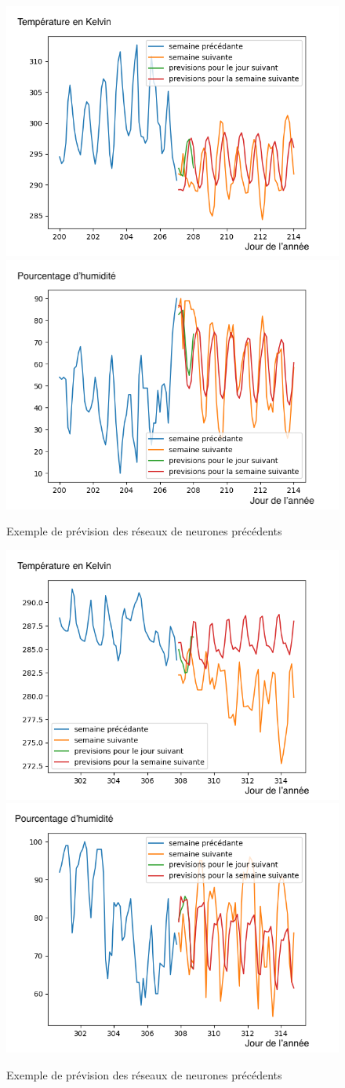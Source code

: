 \documentclass[11pt,a4paper]{article}
\begin{document}
\begin{figure} [H]
\centering
\includegraphics[width=0.48 \textwidth]{./imagesTIPE/imagesIA/dessinTempIA200.png}\quad
\includegraphics[width=0.48 \textwidth]{./imagesTIPE/imagesIA/dessinHumiIA200.png}
\caption{\label{fig:cosDS} Exemple de prévision des réseaux de neurones précédents}
\end{figure}
\begin{figure} [H]
\centering
\includegraphics[width=0.48 \textwidth]{./imagesTIPE/imagesIA/dessinTempIA300,75.png}\quad
\includegraphics[width=0.48 \textwidth]{./imagesTIPE/imagesIA/dessinHumiIA300,75.png}
\caption{\label{fig:cosDS} Exemple de prévision des réseaux de neurones précédents}
\end{figure}
\end{document}
